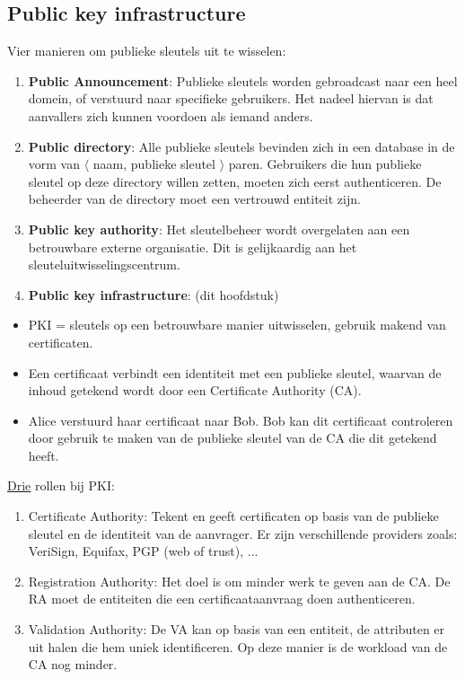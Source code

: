\documentclass{report}
\begin{document}
	\subsection{Public key infrastructure}
	Vier manieren om publieke sleutels uit te wisselen:
	\begin{enumerate}
		\item \textbf{Public Announcement}: Publieke sleutels worden gebroadcast naar een heel domein, of verstuurd naar specifieke gebruikers. Het nadeel hiervan is dat aanvallers zich kunnen voordoen als iemand anders.
		\item \textbf{Public directory}: Alle publieke sleutels bevinden zich in een database in de vorm van $\langle$ naam, publieke sleutel $\rangle$ paren. Gebruikers die hun publieke sleutel op deze directory willen zetten, moeten zich eerst authenticeren. De beheerder van de directory moet een vertrouwd entiteit zijn.
		\item \textbf{Public key authority}: Het sleutelbeheer wordt overgelaten aan een betrouwbare externe organisatie. Dit is gelijkaardig aan het sleuteluitwisselingscentrum.
		\item \textbf{Public key infrastructure}: (dit hoofdstuk)
	\end{enumerate}

	\begin{itemize}
		\item[\info] PKI = sleutels op een betrouwbare manier uitwisselen, gebruik makend van certificaten.
		\item[\info] Een certificaat verbindt een identiteit met een publieke sleutel, waarvan de inhoud getekend wordt door een Certificate Authority (CA).
		\item[\info] Alice verstuurd haar certificaat naar Bob. Bob kan dit certificaat controleren door gebruik te maken van de publieke sleutel van de CA die dit getekend heeft.
	\end{itemize}

	\underline{Drie} rollen bij PKI:
	\begin{enumerate}
		\item Certificate Authority: Tekent en geeft certificaten op basis van de publieke sleutel en de identiteit van de aanvrager. Er zijn verschillende providers zoals: VeriSign, Equifax, PGP (web of trust), ...
		\item Registration Authority: Het doel is om minder werk te geven aan de CA. De RA moet de entiteiten die een certificaataanvraag doen authenticeren.
		\item Validation Authority: De VA kan op basis van een entiteit, de attributen er uit halen die hem uniek identificeren. Op deze manier is de workload van de CA nog minder.
	\end{enumerate}
\end{document}
